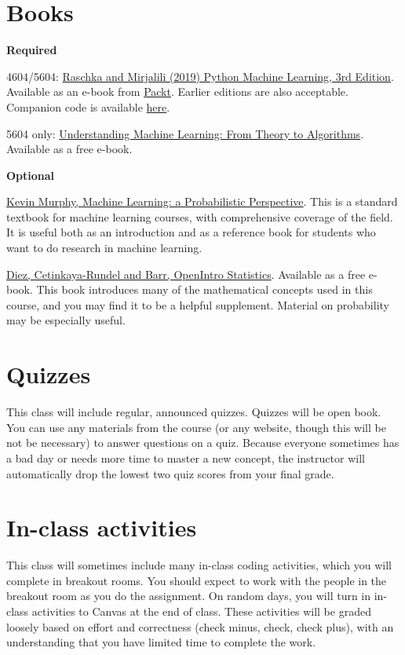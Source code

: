 \documentclass[10pt]{memoir}
\begin{document}
\section{\textbf{Books}}

\textbf{Required}

4604/5604: \href{https://sebastianraschka.com/books.html}{Raschka and Mirjalili (2019) Python Machine Learning, 3rd Edition}. Available as an e-book from \href{https://www.packtpub.com/data/python-machine-learning-third-edition}{Packt}. Earlier editions are also acceptable. Companion code is available \href{https://github.com/rasbt/python-machine-learning-book-3rd-edition}{here}.
 
5604 only: \href{https://www.cs.huji.ac.il/~shais/UnderstandingMachineLearning/copy.html}{Understanding Machine Learning: From Theory to Algorithms}. Available as a free e-book.

\textbf{Optional}

\href{https://www.cs.ubc.ca/~murphyk/MLbook/}{Kevin Murphy, Machine Learning: a Probabilistic Perspective}. This is a standard textbook for machine learning courses, with comprehensive coverage of the field. It is useful both as an introduction and as a reference book for students who want to do research in machine learning.

\href{https://www.abehandler.com/resources/openintro-statistics.pdf}{Diez, Cetinkaya-Rundel and Barr, OpenIntro Statistics}. Available as a free e-book. This book introduces many of the mathematical concepts used in this course, and you may find it to be a helpful supplement. Material on probability may be especially useful.

\section{\textbf{Quizzes}}

This class will include regular, announced quizzes. Quizzes will be open book. You can use any materials from the course (or any website, though this will be not be necessary) to answer questions on a quiz. Because everyone sometimes has a bad day or needs more time to master a new concept, the instructor will automatically drop the lowest two quiz scores from your final grade. 

\section{\textbf{In-class activities}}
This class will sometimes include many in-class coding activities, which you will complete in breakout rooms. You should expect to work with the people in the breakout room as you do the assignment. On random days, you will turn in in-class activities to Canvas at the end of class. These activities will be graded loosely based on effort and correctness (check minus, check, check plus), with an understanding that you have limited time to complete the work. 
\end{document}
